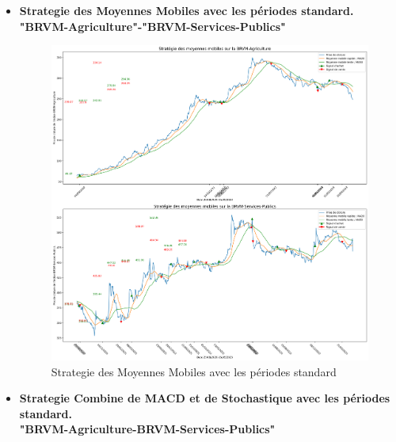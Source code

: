 \begin{itemize}
\item
  \textbf{Strategie des Moyennes Mobiles avec les périodes standard.}\\

  \textbf{"BRVM-Agriculture"-"BRVM-Services-Publics"}

  \begin{figure}
  \hypertarget{fig:Strategieux20desux20Moyennesux20Mobilesux20avecux20lesux20puxe9riodesux20standard}{%
  \centering
  \includegraphics{img/MA-standard.png}
  \caption{Strategie des Moyennes Mobiles avec les périodes
  standard}\label{fig:Strategieux20desux20Moyennesux20Mobilesux20avecux20lesux20puxe9riodesux20standard}
  }
  \end{figure}
\item
  \textbf{Strategie Combine de MACD et de Stochastique avec les périodes
  standard.}\\

  \textbf{"BRVM-Agriculture-BRVM-Services-Publics"}


\end{itemize}
